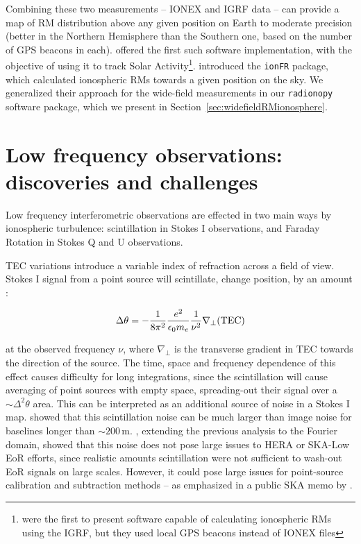 Combining these two measurements -- IONEX and IGRF data -- can provide a map of RM distribution above any given position on Earth to moderate precision (better in the Northern Hemisphere than the Southern one, based on the number of GPS beacons in each). \cite{Afaraimovich.08} offered the first such software implementation, with the objective of using it to track Solar Activity\footnote{\cite{Erickson.01} were the first to present software capable of calculating ionospheric RMs using the IGRF, but they used local GPS beacons instead of IONEX files}. \cite{Sotomayor-Beltran.13} introduced the {\tt ionFR} package, which calculated ionospheric RMs towards a given position on the sky. We generalized their approach for the wide-field measurements in our {\tt radionopy} software package, which we present in Section~\ref{sec:widefieldRMionosphere}.

\section{Low frequency observations: discoveries and challenges}
\label{sec:lowfreqionosphere}

Low frequency interferometric observations are effected in two main ways by ionospheric turbulence: scintillation in Stokes I observations, and Faraday Rotation in Stokes Q and U observations. 

TEC variations introduce a variable index of refraction across a field of view. Stokes I signal from a point source will scintillate, change position, by an amount \citep[e.g.][]{TMS}:

\begin{equation}
\Delta\theta = - \frac{1}{8\pi^2} \frac{e^2}{\epsilon_0 m_e}\frac{1}{\nu^2} \nabla_{\perp}({\rm TEC})
\label{eq:ionosphere_scintillation}
\end{equation}

at the observed frequency $\nu$, where $\nabla_{\perp}$ is the transverse gradient in TEC towards the direction of the source. The time, space and frequency dependence of this effect causes difficulty for long integrations, since the scintillation will cause averaging of point sources with empty space, spreading-out their signal over a $\sim\Delta^2\theta$ area. This can be interpreted as an additional source of noise in a Stokes I map. \cite{Vedantham.15} showed that this scintillation noise can be much larger than image noise for baselines longer than $\sim 200$\,m. \cite{Vedantham.16}, extending the previous analysis to the Fourier domain, showed that this noise does not pose large issues to HERA or SKA-Low EoR efforts, since realistic amounts scintillation were not sufficient to wash-out EoR signals on large scales. However, it could pose large issues for point-source calibration and subtraction methods -- as emphasized in a public SKA memo by \cite{Cornwell.16}.

